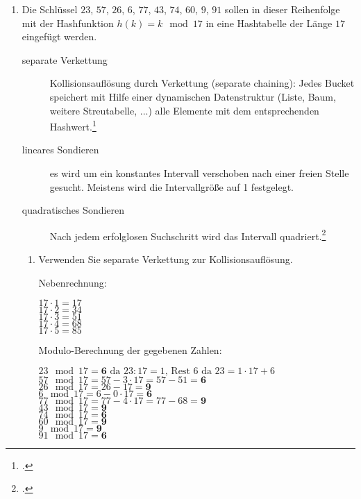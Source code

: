 \documentclass{lehramt-informatik-haupt}
\begin{document}
\begin{enumerate}

\item  Die Schlüssel $23$, $57$, $26$, $6$, $77$, $43$, $74$, $60$, $9$,
$91$ sollen in dieser Reihenfolge mit der Hashfunktion $h(k) = k \mod
17$ in eine Hashtabelle der Länge $17$ eingefügt werden.

\begin{antwort}
\begin{exkurs}[Sondieren]
\begin{description}
\item[separate Verkettung]
Kollisionsauflösung durch Verkettung (separate chaining): Jedes Bucket
speichert mit Hilfe einer dynamischen Datenstruktur (Liste, Baum,
weitere Streutabelle, ...) alle Elemente mit dem entsprechenden
Hashwert.\footcite[Seite 32]{aud:fs:tafeluebung-10}

\item[lineares Sondieren]
es wird um ein konstantes Intervall verschoben nach einer freien Stelle
gesucht. Meistens wird die Intervallgröße auf 1 festgelegt.

\item[quadratisches Sondieren]
Nach jedem erfolglosen Suchschritt wird das Intervall
quadriert.\footcite{wiki:hashtabelle}
\end{description}
\end{exkurs}
\end{antwort}

\begin{enumerate}


\item Verwenden Sie separate Verkettung zur Kollisionsauflösung.

\begin{antwort}
Nebenrechnung:

$17 \cdot 1 = 17$\\
$17 \cdot 2 = 34$\\
$17 \cdot 3 = 51$\\
$17 \cdot 4 = 68$\\
$17 \cdot 5 = 85$

Modulo-Berechnung der gegebenen Zahlen:

$23 \mod 17 = \textbf{6} \text{ da } 23 : 17 = 1 \text{, Rest } 6 \text{ da } 23 = 1 \cdot 17 + 6$\\
$57 \mod 17 = 57 - 3 \cdot 17 = 57 - 51 = \textbf{6}$\\
$26 \mod 17 = 26 - 17 = \textbf{9}$\\
$6 \mod 17 = 6 - 0 \cdot 17 = \textbf{6}$\\
$77 \mod 17 = 77 - 4 \cdot 17 = 77 - 68 = \textbf{9}$\\
$43 \mod 17 = \textbf{9}$\\
$74 \mod 17 = \textbf{6}$\\
$60 \mod 17 = \textbf{9}$\\
$9 \mod 17 = \textbf{9}$\\
$91 \mod 17 = \textbf{6}$\\


\end{antwort}
\end{enumerate}
\end{enumerate}
\end{document}
